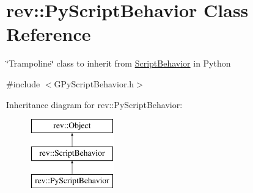 \hypertarget{classrev_1_1_py_script_behavior}{}\section{rev\+::Py\+Script\+Behavior Class Reference}
\label{classrev_1_1_py_script_behavior}


\char`\"{}\+Trampoline\char`\"{} class to inherit from \mbox{\hyperlink{classrev_1_1_script_behavior}{Script\+Behavior}} in Python  




{\ttfamily \#include $<$G\+Py\+Script\+Behavior.\+h$>$}

Inheritance diagram for rev\+::Py\+Script\+Behavior\+:\begin{figure}[H]
\begin{center}
\leavevmode
\includegraphics[height=3.000000cm]{classrev_1_1_py_script_behavior}
\end{center}
\end{figure}
